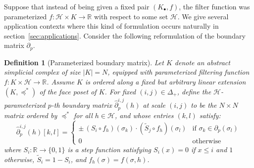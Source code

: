 \documentclass[10pt]{article}
\numberwithin{equation}{section}
\newcommand{\+}{%
	\raisebox{0.18ex}{\scaleobj{0.55}{+}}
}
\newtheorem{definition}{Definition}
\theoremstyle{definition}
\begin{document}
Suppose that instead of being given a fixed pair $(K_\bullet, f)$, the filter function was parameterized $f : \mathcal{H} \times K \to \mathbb{R}$ with respect to some set $\mathcal{H}$.
We give several application contexts where this kind of formulation occurs naturally in section~\ref{sec:applications}. 
Consider the following reformulation of the boundary matrix $\partial_p$. 
\begin{definition}[Parameterized boundary matrix]\label{def:time_boundary_matrix}
Let $K$ denote an abstract simplicial complex of size $\lvert K \rvert = N$, equipped with parameterized filtering function $f : K \times \mathcal{H} \to \mathbb{R}$. 
Assume $K$ is ordered along a fixed but arbitrary linear extension $(K, \preceq^\ast)$ of the face poset of $K$. For fixed $(i,j) \in \Delta_{+}$, define the $\mathcal{H}$-\emph{parameterized} $p$\emph{-th boundary matrix} $\hat{\partial}_p^{i, j}(h)$ \emph{at scale} $(i,j)$ to be the $N \times N$ matrix ordered by $\preceq^\ast$ for all $h \in \mathcal{H}$, and whose entries $(k,l)$ satisfy:
\begin{equation}\label{eq:param_boundary_matrix}
	\hat{\partial}_p^{i,j}(h)[k,l] = \begin{cases}
	\pm \, (S_{i} \circ f_h)(\sigma_k) \cdot (\tilde{S}_{j} \circ f_h)(\sigma_l) & \text{if } \sigma_k \in \partial_p(\sigma_l) \\
	0 & \text{otherwise}
\end{cases}
\end{equation}
where $S_{i} : \mathbb{R} \to \{0, 1\}$ is a \emph{step} function satisfying $S_i(x) = 0$ if $x \leq i$ and $1$ otherwise, $\tilde{S}_{i} = 1 - S_i$, and $f_h(\sigma) = f(\sigma, h)$.
\end{definition}
\end{document}
